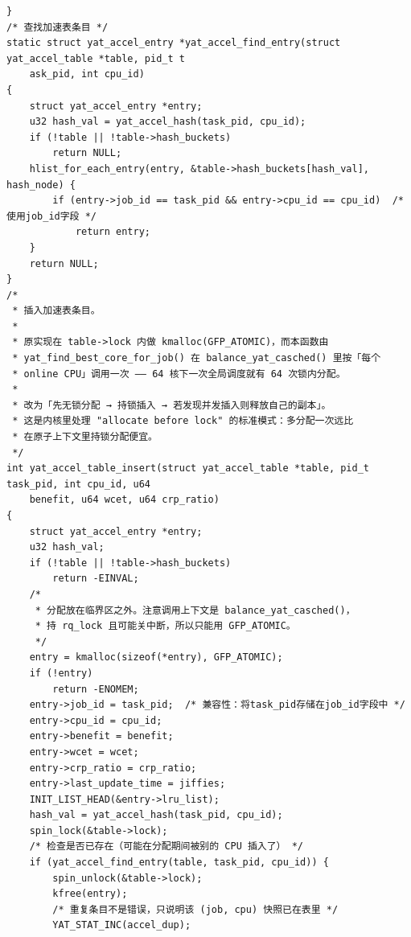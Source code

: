 \documentclass[10pt,a4paper]{article}
\newenvironment{yatpage}{\vspace*{0pt}}{\par}
\begin{document}
\begin{yatpage}
\begin{Verbatim}[fontsize=\fontsize{8.2}{9.8}\selectfont]
}
/* 查找加速表条目 */
static struct yat_accel_entry *yat_accel_find_entry(struct yat_accel_table *table, pid_t t
    ask_pid, int cpu_id)
{
    struct yat_accel_entry *entry;
    u32 hash_val = yat_accel_hash(task_pid, cpu_id);
    if (!table || !table->hash_buckets)
        return NULL;
    hlist_for_each_entry(entry, &table->hash_buckets[hash_val], hash_node) {
        if (entry->job_id == task_pid && entry->cpu_id == cpu_id)  /* 使用job_id字段 */
            return entry;
    }
    return NULL;
}
/*
 * 插入加速表条目。
 *
 * 原实现在 table->lock 内做 kmalloc(GFP_ATOMIC)，而本函数由
 * yat_find_best_core_for_job() 在 balance_yat_casched() 里按「每个
 * online CPU」调用一次 —— 64 核下一次全局调度就有 64 次锁内分配。
 *
 * 改为「先无锁分配 → 持锁插入 → 若发现并发插入则释放自己的副本」。
 * 这是内核里处理 "allocate before lock" 的标准模式：多分配一次远比
 * 在原子上下文里持锁分配便宜。
 */
int yat_accel_table_insert(struct yat_accel_table *table, pid_t task_pid, int cpu_id, u64 
    benefit, u64 wcet, u64 crp_ratio)
{
    struct yat_accel_entry *entry;
    u32 hash_val;
    if (!table || !table->hash_buckets)
        return -EINVAL;
    /*
     * 分配放在临界区之外。注意调用上下文是 balance_yat_casched()，
     * 持 rq_lock 且可能关中断，所以只能用 GFP_ATOMIC。
     */
    entry = kmalloc(sizeof(*entry), GFP_ATOMIC);
    if (!entry)
        return -ENOMEM;
    entry->job_id = task_pid;  /* 兼容性：将task_pid存储在job_id字段中 */
    entry->cpu_id = cpu_id;
    entry->benefit = benefit;
    entry->wcet = wcet;
    entry->crp_ratio = crp_ratio;
    entry->last_update_time = jiffies;
    INIT_LIST_HEAD(&entry->lru_list);
    hash_val = yat_accel_hash(task_pid, cpu_id);
    spin_lock(&table->lock);
    /* 检查是否已存在（可能在分配期间被别的 CPU 插入了） */
    if (yat_accel_find_entry(table, task_pid, cpu_id)) {
        spin_unlock(&table->lock);
        kfree(entry);
        /* 重复条目不是错误，只说明该 (job, cpu) 快照已在表里 */
        YAT_STAT_INC(accel_dup);
\end{Verbatim}
\end{yatpage}
\newpage
\end{document}
